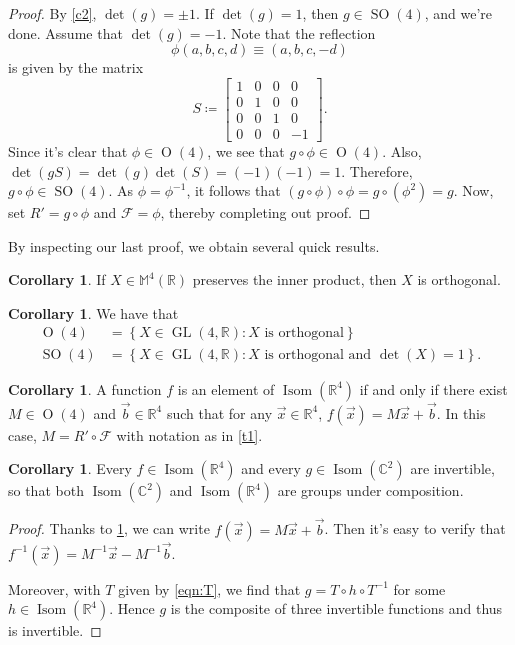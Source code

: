 \documentclass[10pt,letterpaper,cm]{nupset}
\theoremstyle{definition}
\theoremstyle{theorem}
\newtheorem{cor}[definition]{Corollary}
\theoremstyle{remark}
\newcommand{\C}{\mathbb C}
\newcommand{\F}{\mathcal F}
\newcommand{\M}{\mathbb M}
\newcommand{\R}{\mathbb R}
\newcommand{\1}{\mathbf{1}}
\renewcommand{\b}{\vec b}
\newcommand{\x}{\vec x}
\newcommand{\0}{\vec {0}}
\DeclareMathOperator{\ORT}{O}
\DeclareMathOperator{\Isom}{Isom}
\DeclareMathOperator{\SO}{SO}
\DeclareMathOperator{\GL}{GL}
\begin{document}
\begin{proof}
By \cref{c2}, $\det(g)=\pm 1$. If $\det(g)=1$, then $g\in \SO(4)$, and we're done. Assume that $\det(g)={-1}$. 
 Note that the reflection $$\phi(a,b,c,d)\equiv (a,b,c,-d)$$ is given by the matrix $$S\coloneqq\begin{bmatrix} 1 & 0 & 0 & 0 \\ 0&1&0&0\\ 0 & 0 &1 & 0 \\ 0 & 0 &0 &-1 \end{bmatrix}.$$ Since it's clear that $\phi \in \ORT(4)$, we see that $g\circ \phi\in \ORT(4)$. Also, $\det(gS)=\det(g)\det(S)=(-1)(-1)=1$. Therefore, $g\circ \phi \in \SO(4)$. As $\phi = \phi^{-1}$, it follows that $\left(g\circ \phi\right)\circ \phi= g\circ (\phi^2)=g$. Now, set $R'=g\circ \phi$ and $\F=\phi$, thereby completing out proof.


\end{proof}

By inspecting our last proof, we obtain several quick results.

\begin{cor}\label{orth}
If $X\in \M^4(\R)$ preserves the inner product, then $X$ is orthogonal. 
\end{cor}

\begin{cor}
We have that
\begin{align*}
\ORT(4)&=\left\{X\in \GL(4, \R) : X \text{ is orthogonal}\right\}
\\ \SO(4)&=\left\{X\in \GL(4, \R) : X \text{ is orthogonal and }\det(X)=1\right\}.
\end{align*}
\end{cor}

\begin{cor}\label{af}
A function $f$ is an element of $\Isom(\R^4)$ if and only if there exist $M\in \ORT(4)$ and $\b \in \R^4$ such that for any $\x\in \R^4$, $f(\x)=M\x+\b$. In this case, $M=R'\circ \F$ with notation as in \cref{t1}.
\end{cor}

\begin{cor}\label{c12}
Every  $f\in \Isom(\R^4)$ and every $g\in \Isom(\C^2)$ are invertible, so that  both $\Isom(\C^2)$ and $\Isom(\R^4)$ are groups under composition. 
\end{cor}

\begin{proof}
Thanks to \cref{af}, we can write $f(\x)=M\x+\b$. Then it's easy to verify that $f^{-1}(\x)=M^{-1}\x-M^{-1}\b$.

Moreover, with $T$ given by \eqref{eqn:T}, we find that $g=T\circ h \circ T^{-1}$ for some $h\in \Isom(\R^4)$. Hence $g$ is the composite of three invertible functions and thus is invertible. 
\end{proof}
\end{document}
